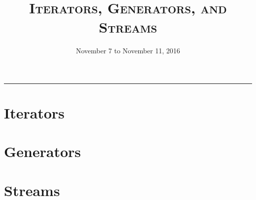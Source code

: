 \documentclass{exam}
\title{\textsc{Iterators, Generators, and Streams}}
\date{November 7 to November 11, 2016}
\begin{document}
\maketitle
\rule{\textwidth}{0.15em}
\fontsize{12}{15}\selectfont


\section{Iterators}
\begin{questions}
    {}
\end{questions}

\section{Generators}
\begin{questions}
    {}
    \newpage
    {}
    {}
\end{questions}

\newpage
\section{Streams}
\lstset{language=Scheme}
\begin{questions}
    {}
    {}
    {}
    {}
\end{questions}

\end{document}
